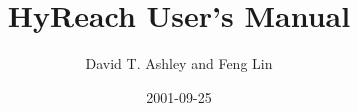 \documentclass[letterpaper,11pt,twoside,titlepage]{article}
\begin{document}
\newcommand{\swname}{HyReach}

\newcommand{\swversion}{1.0}

\newcommand{\authors}{David T. Ashley and Feng Lin}
\newcommand{\authorone}{David T. Ashley}
\newcommand{\authortwo}{Feng Lin}

\title{\swname{} User's Manual}
\author{David T. Ashley and Feng Lin}
\date{2001-09-25}


\clearpage

\raggedbottom
\tableofcontents
\clearpage

\listoffigures

\listoftables

\clearpage{}


\clearpage{}


\clearpage{}


\clearpage{}


\clearpage{}


\clearpage{}


\clearpage{}


\clearpage{}


\clearpage{}


\clearpage{}


\clearpage


\clearpage


\clearpage


\clearpage

\end{document}
